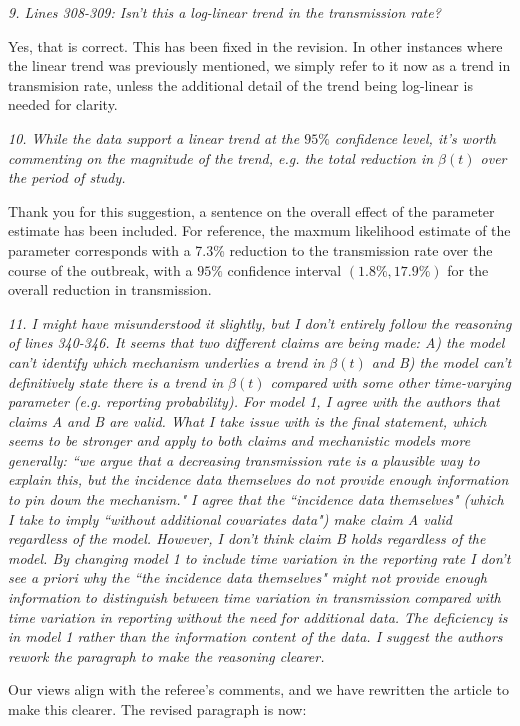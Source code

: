 \documentclass[11pt]{article}
\newcommand\report[1]{{\color{mygreen} \vspace{1mm}\hspace{0.25in}\parbox{6in}{\em #1}}}
\begin{document}
\report{9.
  Lines 308-309: Isn't this a log-linear trend in the transmission rate?
}

Yes, that is correct. This has been fixed in the revision. In other instances where the linear trend was previously mentioned, we simply refer to it now as a trend in transmision rate, unless the additional detail of the trend being log-linear is needed for clarity.

\report{10.
  While the data support a linear trend at the $95\%$ confidence level, it's worth commenting on the magnitude of the trend, e.g. the total reduction in $\beta(t)$ over the period of study.
}

Thank you for this suggestion, a sentence on the overall effect of the parameter estimate has been included.
For reference, the maxmum likelihood estimate of the parameter corresponds with a 7.3\% reduction to the transmission rate over the course of the outbreak, with a $95\%$ confidence interval $(1.8\%, 17.9\%)$ for the overall reduction in transmission.

\report{11.
  I might have misunderstood it slightly, but I don't entirely follow the reasoning of lines 340-346. It seems that two different claims are being made: A) the model can’t identify which mechanism underlies a trend in $\beta(t)$ and B) the model can't definitively state there is a trend in $\beta(t)$ compared with some other time-varying parameter (e.g. reporting probability). For model 1, I agree with the authors that claims A and B are valid. What I take issue with is the final statement, which seems to be stronger and apply to both claims and mechanistic models more generally: ``we argue that a decreasing transmission rate is a plausible way to explain this, but the incidence data themselves do not provide enough information to pin down the mechanism." I agree that the ``incidence data themselves" (which I take to imply ``without additional covariates data") make claim A valid regardless of the model. However, I don’t think claim B holds regardless of the model. By changing model 1 to include time variation in the reporting rate I don't see \emph{a priori} why the ``the incidence data themselves" might not provide enough information to distinguish between time variation in transmission compared with time variation in reporting without the need for additional data. The deficiency is in model 1 rather than the information content of the data. I suggest the authors rework the paragraph to make the reasoning clearer.
}

Our views align with the referee's comments, and we have rewritten the article to make this clearer. The revised paragraph is now: 
\end{document}
